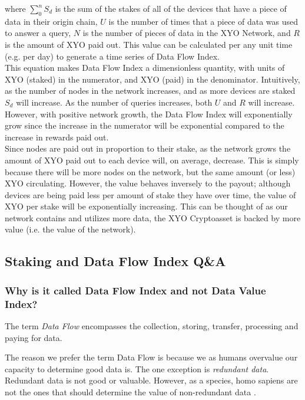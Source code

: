 \documentclass{article}
\begin{document}
where $\sum^{n}_{0}{S_d}$ is the sum of the stakes of all of the devices that have a piece of data in their origin chain, $U$ is the number of times that a piece of data was used to answer a query, $N$ is the number of pieces of data in the XYO Network, and $R$ is the amount of XYO paid out. This value can be calculated per any unit time (e.g. per day) to generate a time series of Data Flow Index. \\
This equation makes Data Flow Index a dimensionless quantity, with units of XYO (staked) in the numerator, and XYO (paid) in the denominator. Intuitively, as the number of nodes in the network increases, and as more devices are staked $S_d$ will increase. As the number of queries increases, both $U$ and $R$ will increase. However, with positive network growth, the Data Flow Index will exponentially grow since the increase in the numerator will be exponential compared to the increase in rewards paid out.\\
Since nodes are paid out in proportion to their stake, as the network grows the amount of XYO paid out to each device will, on average, decrease. This is simply because there will be more nodes on the network, but the same amount (or less) XYO circulating. However, the value behaves inversely to the payout; although devices are being paid less per amount of stake they have over time, the value of XYO per stake will be exponentially increasing. This can be thought of as our network contains and utilizes more data, the XYO Cryptoasset is backed by more value (i.e. the value of the network).

\subsection{Staking and Data Flow Index Q\&A}

\subsubsection{Why is it called Data Flow Index and not Data Value Index?}

The term \textit{Data Flow} encompasses the collection, storing, transfer, processing and paying for data. 

The reason we prefer the term Data Flow is because we as humans overvalue our capacity to determine good data is. The one exception is \textit{redundant data}. Redundant data is not good or valuable. However, as a species, homo sapiens are not the ones that should determine the value of non-redundant data \cite{homo-deus-narrative}. 
\end{document}
